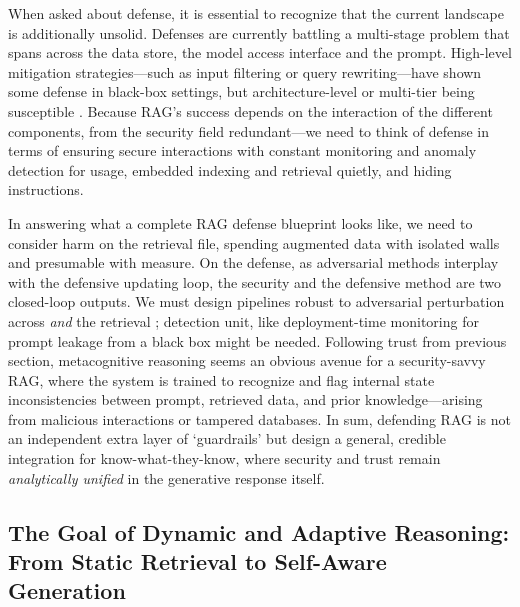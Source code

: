 \documentclass[11pt]{article}
\begin{document}
When asked about defense, it is essential to recognize that the current landscape is additionally unsolid. Defenses are currently battling a multi-stage problem that spans across the data store, the model access interface and the prompt. High-level mitigation strategies---such as input filtering or query rewriting---have shown some defense in black-box settings, but architecture-level or multi-tier being susceptible \cite{ref159}. Because RAG's success depends on the interaction of the different components, from the security field
redundant---we need to think of defense in terms of ensuring secure interactions with constant monitoring and anomaly detection for usage, embedded indexing and retrieval quietly, and hiding instructions.

In answering what a complete RAG defense blueprint looks like, we need to consider harm on the retrieval file, spending augmented data with isolated walls and presumable with measure. On the defense, as adversarial methods interplay with the defensive updating loop, the security and the defensive method are two closed-loop outputs. We must design pipelines robust to adversarial perturbation across \emph{and} the retrieval ; detection unit, like deployment-time monitoring for prompt leakage from a black box might be needed. Following trust from previous section, metacognitive reasoning seems an obvious avenue for a security-savvy RAG, where the system is trained to recognize and flag internal state inconsistencies between prompt, retrieved data, and prior knowledge---arising from malicious interactions or tampered databases. In sum, defending RAG is not an independent extra layer of `guardrails' but design a general, credible integration for know-what-they-know, where security and trust remain \emph{analytically unified} in the generative response itself.

\subsection{The Goal of Dynamic and Adaptive Reasoning: From Static Retrieval to Self-Aware Generation}
\end{document}
